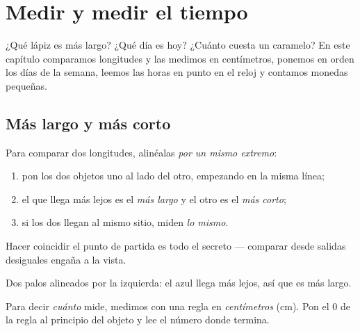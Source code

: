\chapter{Medir y medir el tiempo}\label{ch:g1:measure}

¿Qué lápiz es más largo? ¿Qué día es hoy? ¿Cuánto cuesta un caramelo?
En este capítulo comparamos longitudes y las medimos en centímetros,
ponemos en orden los días de la semana, leemos las horas en punto en el reloj
y contamos monedas pequeñas.

\section{Más largo y más corto}

\begin{method}\label{met:g1:measure:compare}
Para comparar dos longitudes, alinéalas \emph{por un mismo extremo}:
\begin{enumerate}
  \item pon los dos objetos uno al lado del otro, empezando en la misma línea;
  \item el que llega más lejos es el \emph{más largo} y el otro es el
        \emph{más corto};
  \item si los dos llegan al mismo sitio, miden \emph{lo mismo}.
\end{enumerate}
Hacer coincidir el punto de partida es todo el secreto --- comparar desde
salidas desiguales engaña a la vista.
\end{method}

\begin{omfigure}

{\small Dos palos alineados por la izquierda: el azul llega más
lejos, así que es más largo.}
\end{omfigure}

\begin{definition}[El centímetro]\label{def:g1:measure:cm}
Para decir \emph{cuánto} mide, medimos con una regla en
\emph{centímetros} (cm). Pon el $0$ de la regla al principio del
objeto y lee el número donde termina.
\end{definition}

